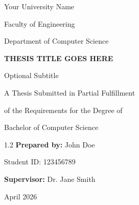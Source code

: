 \documentclass[a4paper]{article}
\begin{document}
\begin{titlepage}
    \centering

    {\fontsize{12pt}{14pt}\selectfont Your University Name\par}
    \vspace{0.5cm}
    {\fontsize{12pt}{14pt}\selectfont Faculty of Engineering\par}
    {\fontsize{12pt}{14pt}\selectfont Department of Computer Science\par}

    \vfill

    {\fontsize{16pt}{19pt}\selectfont\bfseries THESIS TITLE GOES HERE\par}
    \vspace{0.5cm}
    {\fontsize{12pt}{14pt}\selectfont Optional Subtitle\par}

    \vfill

    {\fontsize{12pt}{14pt}\selectfont A Thesis Submitted in Partial Fulfillment\par}
    {\fontsize{12pt}{14pt}\selectfont of the Requirements for the Degree of\par}
    \vspace{0.2cm}
    {\fontsize{12pt}{14pt}\selectfont Bachelor of Computer Science\par}

    \vfill

    \begin{spacing}{1.2}
        \fontsize{12pt}{14pt}\selectfont
        \textbf{Prepared by:} John Doe\par
        Student ID: 123456789\par
        \vspace{0.3cm}
        \textbf{Supervisor:} Dr. Jane Smith\par
    \end{spacing}

    \vfill

    {\fontsize{12pt}{14pt}\selectfont April 2026\par}
\end{titlepage}
\end{document}
